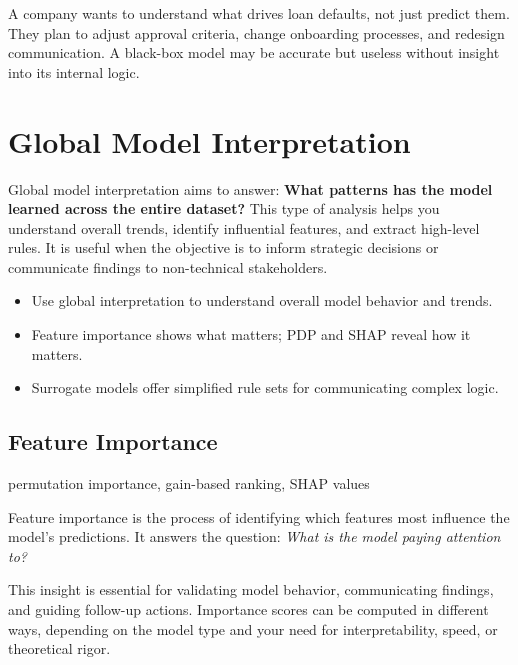\documentclass[12pt,openany]{book}
\begin{document}
\begin{examplebox}
A company wants to understand what drives loan defaults, not just predict them. They plan to adjust approval criteria, change onboarding processes, and redesign communication. A black-box model may be accurate but useless without insight into its internal logic.
\end{examplebox}




\chapter{Global Model Interpretation}

Global model interpretation aims to answer: \textbf{What patterns has the model learned across the entire dataset?} This type of analysis helps you understand overall trends, identify influential features, and extract high-level rules. It is useful when the objective is to inform strategic decisions or communicate findings to non-technical stakeholders.


\begin{summarybox}
\begin{itemize}
  \item Use global interpretation to understand overall model behavior and trends.
  \item Feature importance shows what matters; PDP and SHAP reveal how it matters.
  \item Surrogate models offer simplified rule sets for communicating complex logic.
\end{itemize}
\end{summarybox}



\section{Feature Importance}

\begin{keywordsbox}
permutation importance, gain-based ranking, SHAP values
\end{keywordsbox}

Feature importance is the process of identifying which features most influence the model’s predictions. It answers the question: \textit{What is the model paying attention to?}

This insight is essential for validating model behavior, communicating findings, and guiding follow-up actions. Importance scores can be computed in different ways, depending on the model type and your need for interpretability, speed, or theoretical rigor.
\end{document}
